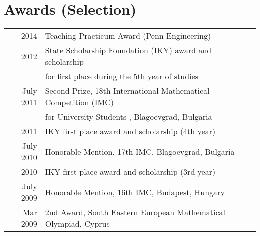 \documentclass[letterpaper]{deedy-resume} %
\begin{document}
\begin{minipage}[t]{0.66\textwidth}


\sectionspace %




\sectionspace %

%  
%  
%  


\section{Awards (Selection)} 

\begin{tabular}{rll}
  2014	 & Teaching Practicum Award (Penn Engineering) \\
  2012 & State Scholarship Foundation (IKY) award and scholarship \\
       & for first place during the 5th year of studies \\
  July  2011  &  Second  Prize,  18th  International Mathematical Competition (IMC) \\
  &  for University Students , Blagoevgrad, Bulgaria \\
  2011 & IKY first place award and scholarship (4th year)\\
  July 2010 &  Honorable Mention,  17th IMC, Blagoevgrad, Bulgaria \\
  2010 & IKY first place award and scholarship (3rd year)\\
  July 2009 &  Honorable Mention,  16th IMC, Budapest, Hungary\\
  Mar 2009  &  2nd Award, South Eastern European Mathematical Olympiad, Cyprus\\


\end{tabular}
\end{minipage}
\end{document}
